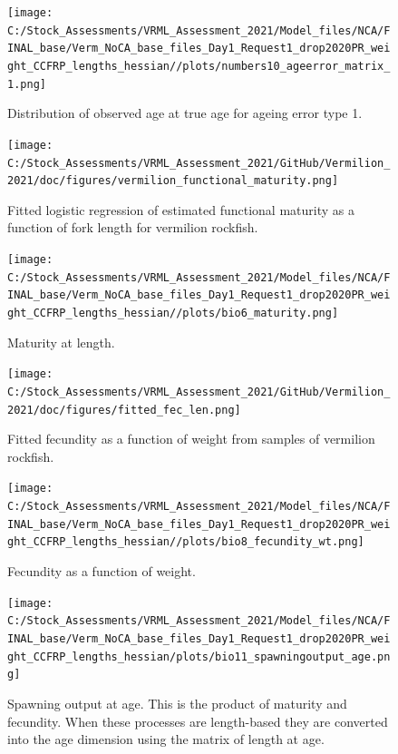 \documentclass[
  english,
  a4paper,
]{article}
\begin{document}
\begin{figure}
\centering
\texttt{[image: C:/Stock\_Assessments/VRML\_Assessment\_2021/Model\_files/NCA/FINAL\_base/Verm\_NoCA\_base\_files\_Day1\_Request1\_drop2020PR\_weight\_CCFRP\_lengths\_hessian//plots/numbers10\_ageerror\_matrix\_1.png]}
\caption{Distribution of observed age at true age for ageing error type 1.\label{fig:ageerror}}
\end{figure}

\begin{figure}
\centering
\texttt{[image: C:/Stock\_Assessments/VRML\_Assessment\_2021/GitHub/Vermilion\_2021/doc/figures/vermilion\_functional\_maturity.png]}
\caption{Fitted logistic regression of estimated functional maturity as a function of fork length for vermilion rockfish.\label{fig:functional-maturity}}
\end{figure}

\begin{figure}
\centering
\texttt{[image: C:/Stock\_Assessments/VRML\_Assessment\_2021/Model\_files/NCA/FINAL\_base/Verm\_NoCA\_base\_files\_Day1\_Request1\_drop2020PR\_weight\_CCFRP\_lengths\_hessian//plots/bio6\_maturity.png]}
\caption{Maturity at length.\label{fig:maturity}}
\end{figure}

\begin{figure}
\centering
\texttt{[image: C:/Stock\_Assessments/VRML\_Assessment\_2021/GitHub/Vermilion\_2021/doc/figures/fitted\_fec\_len.png]}
\caption{Fitted fecundity as a function of weight from samples of vermilion rockfish.\label{fig:fitted-fecundity}}
\end{figure}

\begin{figure}
\centering
\texttt{[image: C:/Stock\_Assessments/VRML\_Assessment\_2021/Model\_files/NCA/FINAL\_base/Verm\_NoCA\_base\_files\_Day1\_Request1\_drop2020PR\_weight\_CCFRP\_lengths\_hessian//plots/bio8\_fecundity\_wt.png]}
\caption{Fecundity as a function of weight.\label{fig:fecundity}}
\end{figure}

\begin{figure}
\centering
\texttt{[image: C:/Stock\_Assessments/VRML\_Assessment\_2021/Model\_files/NCA/FINAL\_base/Verm\_NoCA\_base\_files\_Day1\_Request1\_drop2020PR\_weight\_CCFRP\_lengths\_hessian/plots/bio11\_spawningoutput\_age.png]}
\caption{Spawning output at age. This is the product of maturity and fecundity. When these processes are length-based they are converted into the age dimension using the matrix of length at age.\label{fig:spawnage}}
\end{figure}
\end{document}

